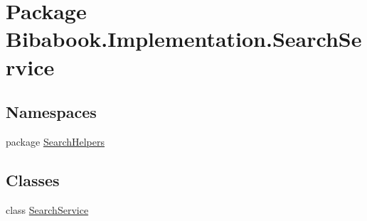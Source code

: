 \hypertarget{namespace_bibabook_1_1_implementation_1_1_search_service}{}\section{Package Bibabook.\+Implementation.\+Search\+Service}
\label{namespace_bibabook_1_1_implementation_1_1_search_service}
\subsection*{Namespaces}
\begin{DoxyCompactItemize}
\item 
package \hyperlink{namespace_bibabook_1_1_implementation_1_1_search_service_1_1_search_helpers}{Search\+Helpers}
\end{DoxyCompactItemize}
\subsection*{Classes}
\begin{DoxyCompactItemize}
\item 
class \hyperlink{class_bibabook_1_1_implementation_1_1_search_service_1_1_search_service}{Search\+Service}
\end{DoxyCompactItemize}
